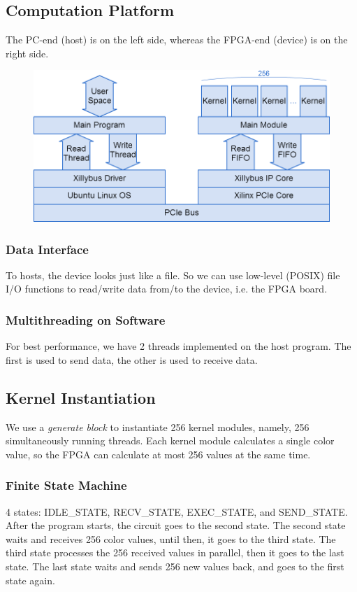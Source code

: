 \documentclass{acm_proc_article-sp}
\begin{document}
\subsection{Computation Platform}
The PC-end (host) is on the left side, whereas the FPGA-end (device) is on the right side.
\begin{figure}[H]
  \includegraphics[width=\linewidth,natwidth=865,natheight=442]{fpga_block.png}
  \label{fig:fpga_block}
\end{figure}
\subsubsection{Data Interface}
To hosts, the device looks just like a file. So we can use low-level (POSIX) file I/O functions to read/write data from/to the device, i.e. the FPGA board.
\subsubsection{Multithreading on Software}
For best performance, we have 2 threads implemented on the host program. The first is used to send data, the other is used to receive data.
\subsection{Kernel Instantiation}
We use a \textit{generate block} to instantiate 256 kernel modules, namely, 256 simultaneously running threads. Each kernel module calculates a single color value, so the FPGA can calculate at most 256 values at the same time.
\subsubsection {Finite State Machine}
4 states: IDLE\_STATE, RECV\_STATE, EXEC\_STATE, and SEND\_STATE. After the program starts, the circuit goes to the second state. The second state waits and receives 256 color values, until then, it goes to the third state. The third state processes the 256 received values in parallel, then it goes to the last state. The last state waits and sends 256 new values back, and goes to the first state again.
\end{document}

